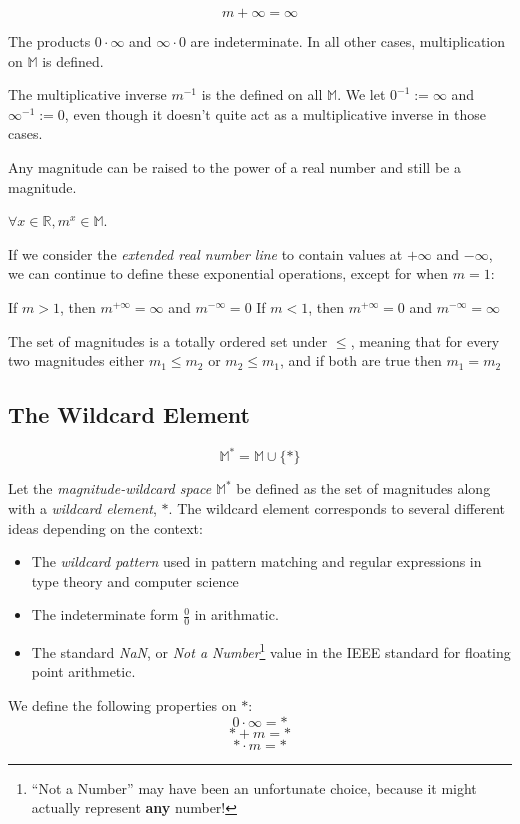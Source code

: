\documentclass[twoside]{article}
\newcommand{\quotes}[1]{``#1''}
\begin{document}
\[m + \infty = \infty\]

The products \(0 \cdot \infty\) and \(\infty \cdot 0\) are indeterminate. In all other cases, multiplication on \(\mathbb{M}\) is defined.

The multiplicative inverse \(m^{-1}\) is the defined on all \(\mathbb{M}\). We let \(0^{-1} := \infty\) and \(\infty^{-1} := 0\), even though it doesn't quite act as a multiplicative inverse in those cases.

Any magnitude can be raised to the power of a real number and still be a magnitude.

\(\forall x \in \mathbb{R}, m^x \in \mathbb{M}\).

If we consider the \textit{extended real number line} to contain values at \(+\infty\) and \(-\infty\), we can continue to define these exponential operations, except for when \(m = 1\):

If \(m > 1\), then \(m^{+\infty} = \infty\) and \(m^{-\infty} = 0\)
If \(m < 1\), then \(m^{+\infty} = 0\) and \(m^{-\infty} = \infty\)

The set of magnitudes is a totally ordered set under \(\leq\), meaning that for every two magnitudes either \(m_1 \leq m_2\) or \(m_2 \leq m_1\), and if both are true then \(m_1 = m_2\)

\subsection{The Wildcard Element}

\[\mathbb{M}^* = \mathbb{M} \cup \{\ast\}\]

Let the \textit{magnitude-wildcard space} \(\mathbb{M}^*\) be defined as the set of magnitudes along with a \textit{wildcard element}, \(\ast\). The wildcard element corresponds to several different ideas depending on the context:
\begin{itemize}
  \item The \textit{wildcard pattern} used in pattern matching and regular expressions in type theory and computer science
  \item The indeterminate form \(\frac{0}{0}\) in arithmatic.
  \item The standard \textit{NaN}, or \textit{Not a Number}\footnote{\quotes{Not a Number} may have been an unfortunate choice, because it might actually represent \textbf{any} number!} value in the IEEE standard for floating point arithmetic.
\end{itemize}

We define the following properties on \(\ast\):
\[0 \cdot \infty = \ast\]
\[\ast + m = \ast\]
\[\ast \cdot m = \ast\]
\end{document}
